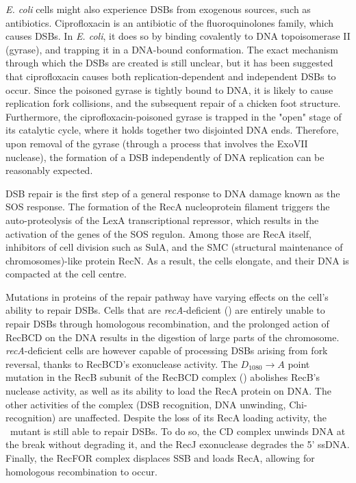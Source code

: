 \emph{E. coli} cells might also experience DSBs from exo\-genous sources, such as anti\-biotics. Ciprofloxacin is an antibiotic of the fluoro\-quinolones family, which causes DSBs. In \emph{E. coli}, it does so by binding covalently to DNA topoisomerase II (gyrase), and trapping it in a DNA-bound conformation\cite{Kohanski2010}. The exact mechanism through which the DSBs are created is still unclear, but it has been suggested that ciprofloxacin causes both replication-dependent and independent DSBs to occur\cite{Ojkic2020}. Since the poisoned gyrase is tightly bound to DNA, it is likely to cause replication fork collisions\cite{Wentzell2000, Drlica2008}, and the subsequent repair of a chicken foot structure. Furthermore, the ciprofloxacin-poisoned gyrase is trapped in the "open" stage of its catalytic cycle, where it holds together two disjointed DNA ends. Therefore, upon removal of the gyrase (through a process that involves the ExoVII nuclease\cite{Huang2021}), the formation of a DSB independently of DNA replication can be reasonably expected\cite{Zhao2006}.

DSB repair is the first step of a general response to DNA damage known as the SOS response\cite{Baharoglu2014}. The formation of the RecA nucleoprotein filament triggers the auto-proteolysis of the LexA transcriptional repressor, which results in the activation of the genes of the SOS regulon. Among those are RecA itself, inhibitors of cell division such as SulA, and the SMC (structural maintenance of chromosomes)-like protein RecN. As a result, the cells elongate\cite{Bos2015}, and their DNA is compacted at the cell centre\cite{Odsbu2014}.

Mutations in proteins of the repair pathway have varying effects on the cell's ability to repair DSBs. Cells that are \emph{recA}-deficient (\dreca) are entirely unable to repair DSBs through homologous recombination, and the prolonged action of RecBCD on the DNA results in the digestion of large parts of the chromosome\cite{Horii1968, Chow2007}. \emph{recA}-deficient cells are however capable of processing DSBs arising from fork reversal, thanks to RecBCD's exonuclease activity\cite{Seigneur1998, Michel2001}. The $D_{1080} \rightarrow A$ point mutation in the RecB subunit of the RecBCD complex (\teneighty) abolishes RecB's nuclease activity, as well as its ability to load the RecA protein on DNA\cite{Yu1998, Wang2000}. The other activities of the complex (DSB recognition, DNA unwinding, Chi-recognition) are unaffected\cite{Anderson1999}. Despite the loss of its RecA loading activity, the \geneteneighty\ mutant is still able to repair DSBs. To do so, the \teneighty CD complex unwinds DNA at the break without degrading it, and the RecJ exonuclease degrades the 5' ssDNA. Finally, the RecFOR complex displaces SSB and loads RecA, allowing for homologous recombination to occur\cite{Ivancic-Bace_2003}.

